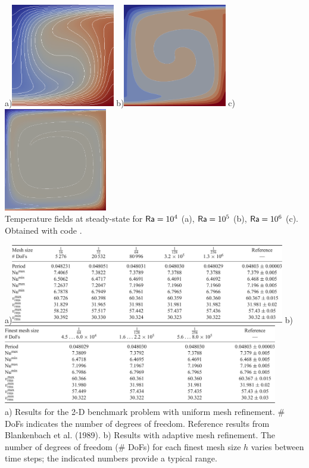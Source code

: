 \begin{center}
a)\includegraphics[width=4.5cm]{images/benchmark_blbc89/temp1a}
b)\includegraphics[width=4.5cm]{images/benchmark_blbc89/temp1b}
c)\includegraphics[width=4.5cm]{images/benchmark_blbc89/temp1c}\\
{\captionfont Temperature fields at steady-state for 
${\mathsf{Ra}}=10^4$ (a), ${\mathsf{Ra}}=10^5$ (b), ${\mathsf{Ra}}=10^6$ (c).
Obtained with \elefant code \cite{thie14}.}
\end{center}


\begin{center}
a)\includegraphics[width=12cm]{images/benchmark_blbc89/krhb12a}
b)\includegraphics[width=12cm]{images/benchmark_blbc89/krhb12b}\\
{\captionfont a) Results for the 2-D benchmark problem with uniform mesh refinement. 
\# DoFs indicates the number of degrees of freedom.
Reference results from Blankenbach et al. (1989).
b) Results with adaptive mesh refinement. The number of degrees of freedom (\# DoFs) for
each finest mesh size $h$ varies between time steps; 
the indicated numbers provide a typical range.}
\end{center}

